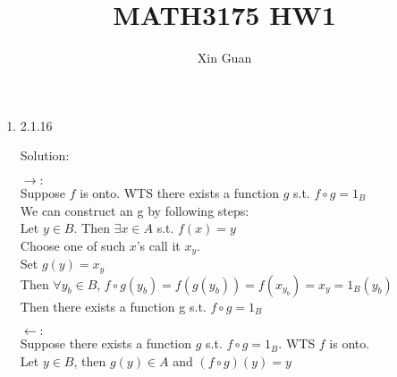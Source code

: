 \documentclass[12pt]{article}
\title{MATH3175 HW1}
\date{}
\author{Xin Guan}
\newcommand{\solu}{{\color{blue} Solution:}}
\begin{document}
 
    \maketitle
    \begin{enumerate}
        \item 2.1.16 
        
        \solu

        $\rightarrow:$\\
        Suppose $f$ is onto. WTS there exists a function $g$ s.t. $f\circ g = 1_B$\\
        We can construct an g by following steps:\\
        Let $y \in B$. Then $\exists x \in A$ s.t. $f(x) = y$\\
        Choose one of such $x$'s call it $x_y$.\\
        Set $g(y) = x_y$\\
        Then $\forall y_b \in B$, $f \circ g(y_b) = f(g(y_b)) = f(x_{y_b}) = x_y = 1_B(y_b)$ \\
        Then there exists a function g s.t. $f \circ g = 1_B$

        $\leftarrow:$\\
        Suppose there exists a function $g$ s.t. $f\circ g = 1_B$. WTS $f$ is onto. \\
        Let $y \in B$, then $g(y) \in A$ and $(f \circ g)(y) = y$
    \end{enumerate}
\end{document}
